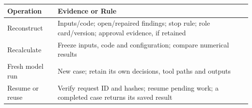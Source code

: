 \begin{tabular}{@{}P{3.0cm}P{9.5cm}@{}}
\toprule
\textbf{Operation} & \textbf{Evidence or Rule} \\
\midrule
Reconstruct & Inputs/code; open/repaired findings; stop rule; role card/version; approval evidence, if retained \\
Recalculate & Freeze inputs, code and configuration; compare numerical results \\
Fresh model run & New case; retain its own decisions, tool paths and outputs \\
Resume or reuse & Verify request ID and hashes; resume pending work; a completed case returns its saved result \\
\bottomrule
\end{tabular}
